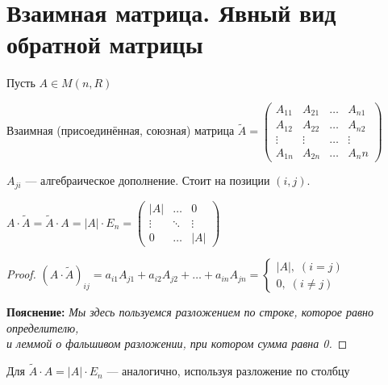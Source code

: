
\section{Взаимная матрица. Явный вид обратной матрицы}

\begin{conj}
    
    Пусть $A \in M(n, R)$

    Взаимная (присоединённая, союзная) матрица $\widetilde{A} =
        \begin{pmatrix}
            A_{11} & A_{21} & \dots & A_{n1} \\
            A_{12} & A_{22} & \dots & A_{n2} \\
            \vdots & \vdots & \dots & \vdots \\
            A_{1n} & A_{2n} & \dots & A_nn
        \end{pmatrix}
    $
    
    $A_{ji}$ --- алгебраическое дополнение. Стоит на позиции $(i, j)$.
\end{conj}

\begin{theorem-non}
    
    $A \cdot \widetilde{A} = \widetilde{A} \cdot A = |A| \cdot E_n =
        \begin{pmatrix}
            |A| & \dots & 0 \\
            \vdots & \ddots & \vdots \\
            0 & \dots & |A|
        \end{pmatrix}
    $


    \begin{proof}
        $(A \cdot \widetilde{A})_{ij} = a_{i1}A_{j1} + a_{i2}A_{j2} + \dots + a_{in}A_{jn} =
            \begin{cases}
                |A|, \; (i = j) \\
                0, \; (i \neq j)
            \end{cases}
        $

        \textbf{Пояснение:}
        \emph{Мы здесь пользуемся разложением по строке,
        которое равно определителю,}\\
        \emph{и леммой о фальшивом разложении, при котором сумма равна 0.}
    \end{proof}

    \notice Для $\widetilde{A} \cdot A = |A| \cdot E_n$ --- аналогично,
    используя разложение по столбцу

\end{theorem-non}

